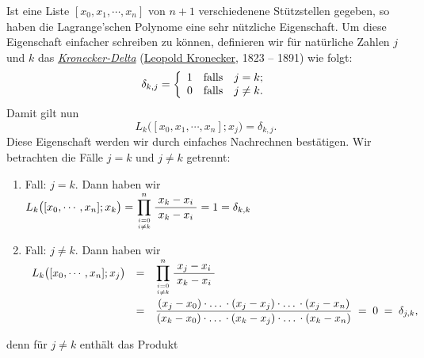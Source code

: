 Ist eine Liste $[x_0,x_1,\cdots,x_n]$ von $n+1$ verschiedenene St\"utzstellen gegeben, so
haben die Lagrange'schen Polynome eine sehr n\"utzliche Eigenschaft.  Um diese
Eigenschaft einfacher schreiben zu k\"onnen, definieren wir f\"ur nat\"urliche Zahlen $j$ und
$k$ das \href{https://de.wikipedia.org/wiki/Kronecker-Delta}{\emph{Kronecker-Delta}}
(\href{https://de.wikipedia.org/wiki/Leopold_Kronecker}{Leopold Kronecker}, 1823 -- 1891) wie folgt:
\begin{equation}
  \label{eq:kroneckerDelta}
  \delta_{k,j} = \left\{ \begin{array}[c]{ll}
                          1 & \mbox{falls} \quad j = k;      \\
                          0 & \mbox{falls} \quad j \not= k.
                         \end{array}
                 \right.  
\end{equation}
Damit gilt nun
\begin{equation}
  \label{eq:lagrangeProperty}
L_k\bigl([x_0,x_1,\cdots,x_n];x_j\bigr) = \delta_{k,j}. 
\end{equation}
Diese Eigenschaft werden wir durch einfaches Nachrechnen best\"atigen.  Wir betrachten die F\"alle
$j=k$ und $j\not=k$ getrennt:
\begin{enumerate}
\item Fall: $j=k$.  Dann haben wir 
      \\[0.2cm]
      \hspace*{0.0cm}
      $\displaystyle L_k\bigl([x_0,\cdots,x_n];x_k\bigr) = \prod\limits_{i=0 \atop i\not=k}^n
      \displaystyle\frac{\;\displaystyle x_k-x_i\;}{\;\displaystyle x_k-x_i\;} = 1 = \delta_{k,k}$
\item Fall: $j\not=k$.  Dann haben wir 
      \\[0.2cm]
      \hspace*{-0.0cm}
      $
      \begin{array}[c]{lcl}
      L_k\bigl([x_0,\cdots,x_n];x_j\bigr) 
      & = & \displaystyle\prod\limits_{i=0 \atop i\not=k}^n \displaystyle\frac{\;\displaystyle x_j-x_i\;}{\;\displaystyle x_k-x_i\;} \\[0.6cm]
      & = & \displaystyle\frac{(x_j - x_0) \cdot \mbox{$\dots$} \cdot  (x_j - x_j) \cdot \mbox{$\dots$} \cdot (x_j - x_n)}{
                     (x_k - x_0) \cdot \mbox{$\dots$} \cdot (x_k - x_j) \cdot \mbox{$\dots$} \cdot (x_k - x_n)} 
        \;=\; 0 \;=\; \delta_{j,k},
      \end{array}
      $
\end{enumerate}
denn f\"ur $j \not= k$ enth\"alt das Produkt 
\\[0.2cm]
\hspace*{1.3cm}
